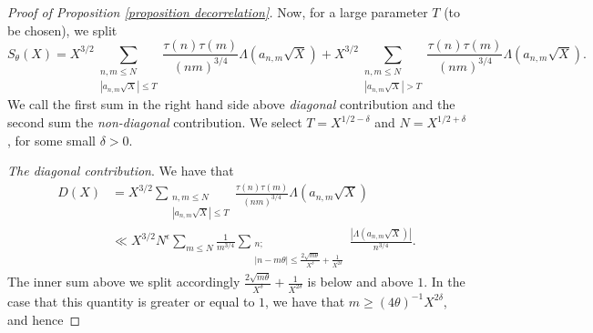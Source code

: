 \documentclass[a4paper,12pt, reqn0]{amsart}
\theoremstyle{remark}
\begin{document}
\begin{proof}[Proof of Proposition \ref{proposition decorrelation}]
Now, for a large parameter $T$ (to be chosen), we split
$$S_\theta(X)=X^{3/2}\sum_{\substack{n,m\leq N\\ |a_{n,m}\sqrt{X}|\leq T}}
\frac{\tau(n)\tau(m)}{(nm)^{3/4}}\Lambda(a_{n,m}\sqrt{X})+X^{3/2}\sum_{\substack{n,m\leq
    N\\ |a_{n,m}\sqrt{X}|> T}}
\frac{\tau(n)\tau(m)}{(nm)^{3/4}}\Lambda(a_{n,m}\sqrt{X}).$$ We call
the first sum in the right hand side above \textit{diagonal}
contribution and the second sum the \textit{non-diagonal}
contribution. We select $T=X^{1/2-\delta}$ and $N=X^{1/2+\delta}$, for
some small $\delta>0$.

\noindent \textit{The diagonal contribution}. We have that
\begin{align}\label{equation diagonal contribution}
D(X)&=X^{3/2}\sum_{\substack{n,m\leq N\\ |a_{n,m}\sqrt{X}|\leq T}}
\frac{\tau(n)\tau(m)}{(nm)^{3/4}}\Lambda(a_{n,m}\sqrt{X})\\
&\ll X^{3/2}N^\epsilon\sum_{m\leq N}\frac{1}{m^{3/4}}\sum_{\substack{n;\\|n-m\theta|\leq\frac{2\sqrt{m\theta}}{X^\delta}+\frac{1}{X^{2\delta}}}}\frac{|\Lambda(a_{n,m}\sqrt{X})|}{n^{3/4}}.
\end{align}
The inner sum above we split accordingly $\frac{2\sqrt{m\theta}}{X^\delta}+\frac{1}{X^{2\delta}}$ is below and above $1$. In the case that this quantity is greater or equal to $1$, we have that $m\geq (4\theta)^{-1}X^{2\delta}$, and hence


\end{proof}
\end{document}
